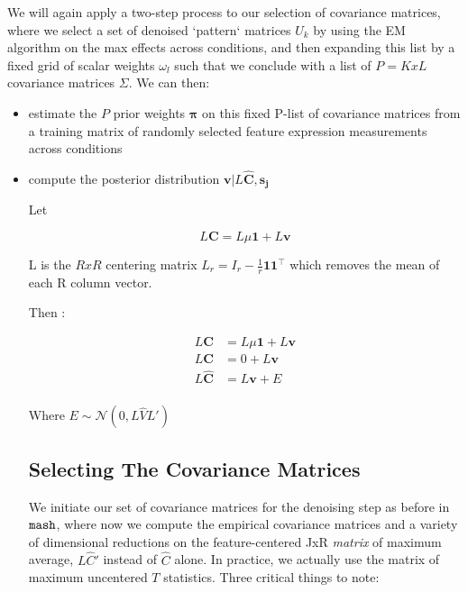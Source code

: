 \documentclass[11pt, oneside]{article}   	%
\newcommand{\Norm}{{\mathcal{N}}} %
\newcommand{\ceff}{\bm{C}}
\newcommand{\chat}{\bm{\hat{C}}}
\newcommand{\vb}{\bm{v}}
\def\mash{{\tt mash}}
\begin{document}
We will again apply a two-step process to our selection of covariance matrices, where we select a set of denoised `pattern` matrices $U_{k}$ by using the EM algorithm on the max effects across conditions,
and then expanding this list by a fixed grid of scalar weights $\omega_{l}$ such that we conclude with a list of $P=KxL$ covariance matrices $\Sigma$. We can then:
\begin{itemize}
\item estimate the $P$ prior weights $\bm\pi$ on this fixed P-list of covariance matrices from a training matrix of randomly selected feature expression measurements across conditions
\item compute the posterior distribution $\vb | L \chat, \bm{s_{j}}$

Let 

\begin{equation}
L \ceff = L \mu \bm{1} + L \vb
\end{equation}

L is the $RxR$ centering matrix $L_{r}=I_{r}-{\tfrac  {1}{r}}{\mathbf  {1}}{\mathbf  {1}}^{\top }$ which removes the mean of each R column vector.

Then :

\begin{equation}
\begin{aligned}
L \ceff &= L \mu \bm{1}+ L \vb \\
L \ceff &= 0 + L \vb \\
L \chat &= L \vb + E \\
\end{aligned}
\end{equation}



Where $E \sim \Norm (0, L\hat{V} L')$


\subsection{Selecting The Covariance Matrices}

We initiate our set of covariance matrices for the denoising step as before in $\mash$, where now we compute the empirical covariance matrices and a variety of dimensional reductions on the feature-centered JxR \textit{matrix} of maximum average, $L \hat{C}' $ instead of $\hat{C}$ alone. In practice, we actually use the matrix of maximum uncentered $T$ statistics. Three critical things to note:


\end{itemize}
\end{document}
